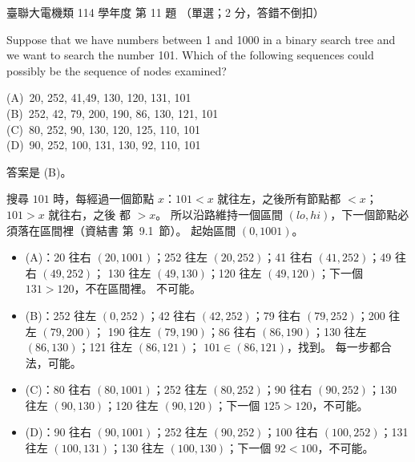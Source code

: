 \begin{pastexam}[label={px:ust-114-ee-ds-11}]{臺聯大電機類 114 學年度 第 11 題}
（單選；2 分，答錯不倒扣）

Suppose that we have numbers between 1 and 1000 in a binary search tree and we want to search the
number 101. Which of the following sequences could possibly be the sequence of nodes examined?

(A)~20, 252, 41,49, 130, 120, 131, 101\\
(B)~252, 42, 79, 200, 190, 86, 130, 121, 101\\
(C)~80, 252, 90, 130, 120, 125, 110, 101\\
(D)~90, 252, 100, 131, 130, 92, 110, 101
\end{pastexam}

\begin{pastsoln}
答案是 (B)。

搜尋 $101$ 時，每經過一個節點 $x$：$101 < x$ 就往左，之後所有節點都 $< x$；$101 > x$ 就往右，之後
都 $> x$。 所以沿路維持一個區間 $(\mathit{lo}, \mathit{hi})$，下一個節點必須落在區間裡（資結書
第~9.1~節）。 起始區間 $(0, 1001)$。
\begin{itemize}
\item (A)：20 往右 $(20, 1001)$；252 往左 $(20, 252)$；41 往右 $(41, 252)$；49 往右 $(49, 252)$；
130 往左 $(49, 130)$；120 往左 $(49, 120)$；下一個 $131 > 120$，不在區間裡。 不可能。
\item (B)：252 往左 $(0, 252)$；42 往右 $(42, 252)$；79 往右 $(79, 252)$；200 往左 $(79, 200)$；
190 往左 $(79, 190)$；86 往右 $(86, 190)$；130 往左 $(86, 130)$；121 往左 $(86, 121)$；
$101 \in (86, 121)$，找到。 每一步都合法，可能。
\item (C)：80 往右 $(80, 1001)$；252 往左 $(80, 252)$；90 往右 $(90, 252)$；130 往左
$(90, 130)$；120 往左 $(90, 120)$；下一個 $125 > 120$，不可能。
\item (D)：90 往右 $(90, 1001)$；252 往左 $(90, 252)$；100 往右 $(100, 252)$；131 往左
$(100, 131)$；130 往左 $(100, 130)$；下一個 $92 < 100$，不可能。
\end{itemize}
\end{pastsoln}
